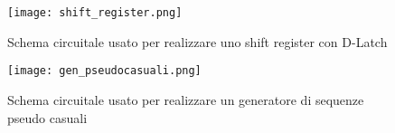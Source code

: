 \begin{figure}[h]
	\centering
	\texttt{[image: shift\_register.png]}
	\caption{Schema circuitale usato per realizzare uno shift register con D-Latch}
	\label{f:shift_register}
\end{figure}


\begin{figure}[h]
	\centering
	\texttt{[image: gen\_pseudocasuali.png]}
	\caption{Schema circuitale usato per realizzare un generatore di sequenze pseudo casuali}
	\label{f:gen_pseudocasuali}
\end{figure}